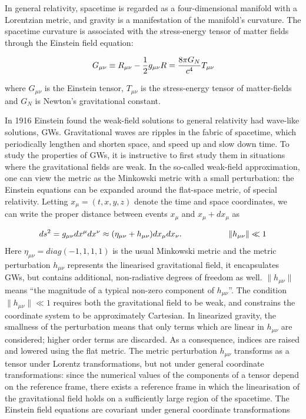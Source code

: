 \documentclass[binding=0.6cm, LaM]{sapthesis}
\begin{document}
	In general relativity, spacetime is regarded as a four-dimensional manifold 
	with a Lorentzian metric, and gravity is a manifestation of the manifold’s curvature. 
	The spacetime curvature is associated with the stress-energy tensor 
	of matter fields through the Einstein field equation:

		\begin{equation}
		G_{\mu\nu} \equiv R_{\mu\nu}  - {1 \over 2}g_{\mu\nu}R = {8\pi G_{N} \over {c^4}}T_{\mu\nu} 
		\end{equation}

	where $G_{\mu\nu} $ is the Einstein tensor, $T_{\mu\nu} $ is the stress-energy 
	tensor of matter-fields and $ G_{N}$ is Newton’s gravitational constant. 

	In 1916 Einstein found the weak-field solutions to general relativity had wave-like solutions, GWs.
	Gravitational waves are ripples in the fabric of spacetime, 
	which periodically lengthen and shorten space, and speed up and slow down time.
 	To study the properties of GWs, it is instructive to first study them 
	in situations where the gravitational fields are weak.
	In the so-called weak-field approximation, one can view the metric as the Minkowski metric 
	with a small perturbation: the Einstein equations can be expanded around the flat-space metric, of special relativity.
	Letting $ x_\mu = (t, x, y, z)$ denote the time and space coordinates, 
	we can write the proper distance between events $x_{\mu}$ and $x_{\mu} + dx_{\mu}$ as
		
		\[
		ds^2 = g_{\mu\nu}dx^{\mu}dx^{\nu} \approx (\eta_{\mu\nu} + h_{\mu\nu})dx_{\mu}dx_{\nu}. \hspace*{2cm}\|h_{\mu\nu}\|\ll 1
		\]
	Here $\eta_{\mu\nu} = diag(-1,1,1,1)$ is the usual Minkowski metric and the metric perturbation  $h_{\mu\nu}$ 
	represents the linearised gravitational field, it encapsulates GWs, 
	but contains additional, non-radiative degrees of freedom as well. $\|h_{\mu\nu}\|$ means
	“the magnitude of a typical non-zero component of $h_{\mu\nu}$”. 
	The condition $\|h_{\mu\nu}\|\ll 1$ requires both the gravitational field to be weak, 
	and constrains the coordinate system to be approximately Cartesian.  
	In linearized gravity, the smallness of the perturbation means that only terms which are linear in $h_{\mu\nu}$ are considered;
	higher order terms are discarded. As a consequence, indices are raised and lowered using the flat metric. 
	The metric perturbation $h_{\mu\nu}$ transforms as a tensor under Lorentz transformations, 
	but not under general coordinate transformations: since the numerical values of the components
	of a tensor depend on the reference frame, there exists a reference frame in which 
	the linearisation of the gravitational field holds on a sufficiently large region of the spacetime. 
	The Einstein field equations are covariant under general coordinate transformations
\end{document}
